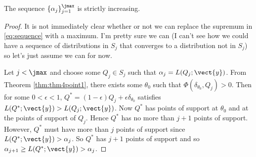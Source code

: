 	\begin{lemma} \label{lem:sequencestrictlyincreasing}
		The sequence $\{ \alpha_j\}_{j=1}^{\jmax}$ is strictly increasing.
	\end{lemma}
	\begin{proof}	
		
		It is not immediately clear whether or not we can replace the supremum in \eqref{eq:sequence} with a maximum. I'm pretty sure we can (I can't see how we could have a sequence of distributions in $S_j$ that converges to a distribution not in $S_j$) so let's just assume we can for now.
		
		Let $j < \jmax$ and choose some $Q_j \in S_j$ such that $\alpha_j = L(Q_j;\vect{y})$. From Theorem \ref{thm:thm4point1}, there exists some $\theta_0$ such that $\Phi(\delta_{\theta_0},Q_j) > 0$. Then for some $0<\epsilon <1$, $Q^* = (1-\epsilon)Q_j + \epsilon \delta_{\theta_0}$ satisfies $L(Q^*;\vect{y}) > L(Q_j;\vect{y})$. Now $Q^*$ has points of support at $\theta_0$ and at the points of support of $Q_j$. Hence $Q^*$ has no more than $j+1$ points of support. However, $Q^*$ must have more than $j$ points of support since $L(Q^*;\vect{y}) > \alpha_j$. So $Q^*$ has $j+1$ points of support and so $\alpha_{j+1} \geq L(Q^*;\vect{y}) > \alpha_j$.
	\end{proof}

